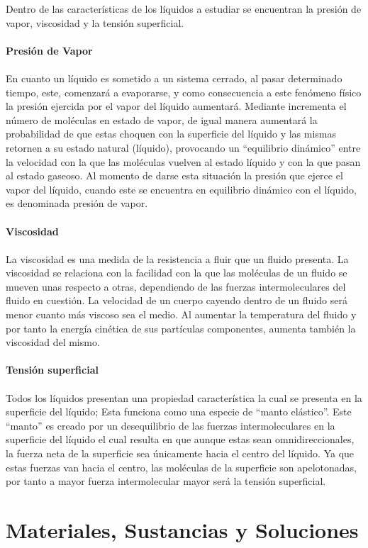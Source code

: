 \documentclass{article}
\begin{document}
Dentro de las características de los líquidos a estudiar se encuentran la presión de vapor, viscosidad y la tensión superficial.
\\
\\
\textbf{Presión de Vapor}
\\
\\
En cuanto un líquido es sometido a un sistema cerrado, al pasar determinado tiempo, este, comenzará a evaporarse, y como consecuencia a este fenómeno físico la presión ejercida por el vapor del líquido aumentará. Mediante incrementa el número de moléculas en estado de vapor, de igual manera aumentará la probabilidad de que estas choquen con la superficie del líquido y las mismas retornen a su estado natural (líquido), provocando un “equilibrio dinámico” entre la velocidad con la que las moléculas vuelven al estado líquido y con la que pasan al estado gaseoso. Al momento de darse esta situación la presión que ejerce el vapor del líquido, cuando este se encuentra en equilibrio dinámico con el líquido, es denominada presión de vapor. 
\\
\\
\textbf{Viscosidad}
\\
\\
La viscosidad es una medida de la resistencia a fluir que un fluido presenta. La viscosidad se relaciona con la facilidad con la que las moléculas de un fluido se mueven unas respecto a otras, dependiendo de las fuerzas intermoleculares del fluido en cuestión. La velocidad de un cuerpo cayendo dentro de un fluido será menor  cuanto más viscoso sea el medio. Al aumentar la temperatura del fluido y por tanto la energía cinética de sus partículas componentes,  aumenta también la viscosidad del mismo.
\\
\\
\textbf{Tensión superficial}
\\
\\
Todos los líquidos presentan una propiedad característica la cual se presenta en la superficie del líquido; Esta funciona como una especie de “manto elástico”. Este “manto” es creado por un desequilibrio de las fuerzas intermoleculares en la superficie del líquido el cual resulta en que aunque estas sean omnidireccionales, la fuerza neta de la superficie sea únicamente hacia el centro del líquido. Ya que estas fuerzas van hacia el centro, las moléculas de la superficie son apelotonadas, por tanto a mayor fuerza intermolecular mayor será la tensión superficial.

\section{Materiales, Sustancias y Soluciones}
\end{document}
